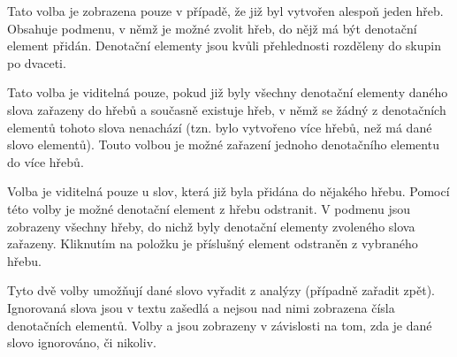 \documentclass[dp.tex]{subfiles}
\begin{document}
\begin{description}[style=nextline]
	\item[\keys{Přidat do hřebu $\kern 10pt\triangleright$}] Tato volba je zobrazena pouze v případě, že již byl vytvořen alespoň jeden hřeb. Obsahuje podmenu, v němž je možné zvolit hřeb, do nějž má být denotační element přidán. Denotační elementy jsou kvůli přehlednosti rozděleny do skupin po dvaceti.

	\item[\keys{Přidat do jiného hřebu}] Tato volba je viditelná pouze, pokud již byly všechny denotační elementy daného slova zařazeny do hřebů a současně existuje hřeb, v němž se žádný z denotačních elementů tohoto slova nenachází (tzn. bylo vytvořeno více hřebů, než má dané slovo elementů). Touto volbou je možné zařazení jednoho denotačního elementu do více hřebů.

	\item[\keys{Odebrat z hřebu $\kern 10pt\triangleright$}] Volba je viditelná pouze u slov, která již byla přidána do nějakého hřebu. Pomocí této volby je možné denotační element z hřebu odstranit. V podmenu jsou zobrazeny všechny hřeby, do nichž byly denotační elementy zvoleného slova zařazeny. Kliknutím na položku je příslušný element odstraněn z vybraného hřebu.

	\item[\keys{Ignorovat} / \keys{Brát v potaz}] Tyto dvě volby umožňují dané slovo vyřadit z analýzy (případně zařadit zpět). Ignorovaná slova jsou v textu zašedlá a nejsou nad nimi zobrazena čísla denotačních elementů. Volby  a  jsou zobrazeny v závislosti na tom, zda je dané slovo  ignorováno, či nikoliv.
\end{description}
\end{document}
